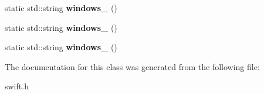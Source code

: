 \begin{DoxyCompactItemize}
\item 
\hypertarget{classswift_1_1_charset_a58be3249f00caef21e7d686d12d48130}{static std\-::string {\bfseries windows\-\_} ()}\label{classswift_1_1_charset_a58be3249f00caef21e7d686d12d48130}

\item 
\hypertarget{classswift_1_1_charset_ae334f3bf6274c980b5dd6bb58d75f9d8}{static std\-::string {\bfseries windows\-\_} ()}\label{classswift_1_1_charset_ae334f3bf6274c980b5dd6bb58d75f9d8}

\item 
\hypertarget{classswift_1_1_charset_af9c636c76cd001f52f32fba0efd275a1}{static std\-::string {\bfseries windows\-\_} ()}\label{classswift_1_1_charset_af9c636c76cd001f52f32fba0efd275a1}

\end{DoxyCompactItemize}


The documentation for this class was generated from the following file\-:\begin{DoxyCompactItemize}
\item 
swift.\-h\end{DoxyCompactItemize}
